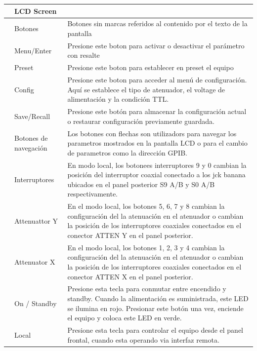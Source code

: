 \begin{center}
	\tablefirsthead{}
	\tablehead{}
	\tabletail{}
	\tablelasttail{}
	\begin{supertabular}{|m{0.881cm}|m{3.9609997cm}|m{11.985001cm}|}
		\hline
		 &
		\centering LCD Screen &
		~
		\\\hline
		  &
		\centering Botones &
		\centering\arraybslash Botones sin marcas referidos al contenido por el texto de la pantalla\\\hline
		 &
		\centering Menu/Enter &
		\centering\arraybslash Presione este boton para activar o desactivar el parámetro con resalte\\\hline
		 &
		\centering Preset &
		\centering\arraybslash Presione este boton para establecer en preset el equipo\\\hline
		 &
		\centering Config &
		\centering\arraybslash Presione este boton para acceder al menú de configuración. Aquí se establece el tipo de
		atenuador, el voltage de alimentación y la condición TTL.\\\hline
		 &
		\centering Save/Recall &
		\centering\arraybslash Presione este botón para almacenar la configuración actual o restaurar configuración previamente
		guardada.\\\hline
		 &
		\centering Botones de navegación &
		\centering\arraybslash Los botones con flechas son utilizadors para navegar los parametros mostrados en la pantalla LCD
		o para el cambio de parametros como la dirección GPIB.\\\hline
		 &
		\centering Interruptores &
		\centering\arraybslash En modo local, los botonees interruptores 9 y 0 cambian la posición del interruptor coaxial
		conectado a los jck banana ubicados en el panel posterior S9 A/B y S0 A/B respectivamente.\\\hline
		 &
		\centering Attenuattor Y &
		\centering\arraybslash En el modo local, los botones 5, 6, 7 y 8 cambian la configuración del la atenuación en el
		atenuador o cambian la posición de los interruptores coaxiales conectados en el conector ATTEN Y en el panel
		posterior.\\\hline
		 &
		\centering Attenuator X &
		\centering\arraybslash En el modo local, los botones 1, 2, 3 y 4 cambian la configuración del la atenuación en el
		atenuador o cambian la posición de los interruptores coaxiales conectados en el conector ATTEN X en el panel
		posterior.\\\hline
		 &
		\centering On / Standby &
		\centering\arraybslash Presione esta tecla para conmutar entre encendido y standby. Cuando la alimentación es
		suministrada, este LED se ilumina en rojo. Presionar este botón una vez, enciende el equipo y coloca este LED en
		verde.\\\hline
		 &
		\centering Local &
		\centering\arraybslash Presione esta tecla para controlar el equipo desde el panel frontal, cuando esta operando via
		interfaz remota.\\\hline
	\end{supertabular}
\end{center}		

